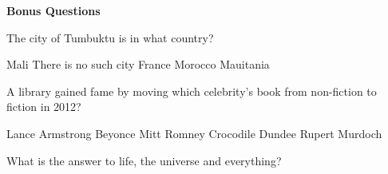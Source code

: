 \documentclass[10pt,addpoints]{exam}
\begin{document}
\begin{questions}



\newpage
\begin{center}
{\Large \textbf{Bonus Questions}}
\end{center}

\par\vspace{0.100000in}\begin{minipage}{\linewidth}
\bonusquestion[2]
The city of Tumbuktu is in what country?
\medskip
\begin{choices}
\choice Mali
\choice There is no such city
\choice France
\choice Morocco
\choice Mauitania
\end{choices}
\setlength\answerlinelength{1in}
\answerline[A]

\end{minipage}


\par\vspace{0.100000in}\begin{minipage}{\linewidth}
\bonusquestion[2]
A library gained fame by moving which celebrity's book from non-fiction to fiction in 2012?
\medskip
\begin{choices}
\choice Lance Armstrong
\choice Beyonce
\choice Mitt Romney
\choice Crocodile Dundee
\choice Rupert Murdoch
\end{choices}
\setlength\answerlinelength{1in}
\answerline[A]

\end{minipage}


\par\vspace{0.100000in}\begin{minipage}{\linewidth}
\vspace{.35cm}\bonusquestion[2]
What is the answer to life, the universe and everything?
\vspace{.25cm}\setlength\answerlinelength{3in}
\answerline[42]
\end{minipage}





\end{questions}
\end{document}
